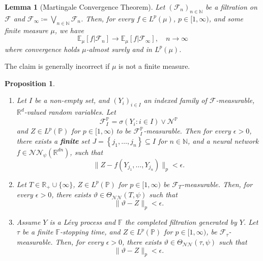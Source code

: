 \documentclass[11pt,a4paper,twoside,openany]{report}
\numberwithin{equation}{section}
\theoremstyle{plain} %
\newtheorem{proposition}[theorem]{Proposition}
\newtheorem{lemma}[theorem]{Lemma}
\theoremstyle{definition} %
\theoremstyle{remark} %
\begin{document}
\begin{lemma}[Martingale Convergence Theorem]\label{lemma:Martingale Convergence Theorem}
    Let \((\mathcal{F}_n)_{n\in\mathbb{N}}\) be a filtration on \(\mathcal{F}\) and \(\mathcal{F}_{\infty}\coloneqq\bigvee_{n\in\mathbb{N}}\mathcal{F}_n\). Then, for every \(f\in L^p(\mu)\), \(p\in[1,\infty)\), and some finite measure \(\mu\), we have
    \begin{equation*}
        \mathbb{E}_{\mu}[f|\mathcal{F}_n]\to\mathbb{E}_{\mu}[f|\mathcal{F}_{\infty}],\quad n\to\infty
    \end{equation*}
 where convergence holds \(\mu\)-almost surely and in \(L^p(\mu)\).
\end{lemma}
The claim is generally incorrect if \(\mu\) is not a finite measure.
\begin{proposition}\label{prop:approximation of measurable maps by algorithmic strategies}
\begin{enumerate}
    \item Let \(I\) be a non-empty set, and \((Y_i)_{i\in I}\) an indexed family of \(\mathcal{F}\)-measurable, \(\mathbb{R}^d\)-valued random variables. Let 
    \begin{equation*}
        \mathcal{F}_I^{\mathbb{P}}=\sigma(Y_i:i\in I)\vee\mathcal{N}^\mathbb{P}
    \end{equation*}
    and \(Z\in L^p(\mathbb{P})\) for \(p\in[1,\infty)\) to be \(\mathcal{F}_I^{\mathbb{P}}\)-measurable. Then for every \(\epsilon>0\), there exists a \textbf{finite} set \(J=\left\{j_1,\dots,j_n\right\}\subseteq I\) for \(n\in\mathbb{N}\), and a neural network \(f\in\mathcal{NN}_\psi(\mathbb{R}^{dn})\), such that 
    \begin{equation*}
        \lVert Z-f(Y_{j_1},\dots, Y_{j_n})\rVert_{p}<\epsilon.
    \end{equation*}
    \item Let  \(T\in\mathbb{R}_+\cup\{\infty\}\),  \(Z\in L^p(\mathbb{P})\) for \(p\in[1,\infty)\) be \(\mathcal{F}_T\)-measurable. Then, for every \(\epsilon>0\), there exists \(\vartheta\in\Theta_{\mathcal{NN}}(T,\psi)\) such that 
    \begin{equation*}
        \lVert \vartheta-Z\rVert_{p}<\epsilon.
    \end{equation*}
    \item Assume \(Y\) is a Lévy process and \(\mathbb{F}\) the completed filtration generated by \(Y\). Let \(\tau\) be a finite \(\mathbb{F}\)-stopping time, and \(Z\in L^p(\mathbb{P})\) for \(p\in[1,\infty)\), be \(\mathcal{F}_{\tau}\)-measurable. Then, for every \(\epsilon>0\), there exists \(\vartheta\in\Theta_{\mathcal{NN}}(\tau,\psi)\) such that 
    \begin{equation*}
        \lVert \vartheta-Z\rVert_{p}<\epsilon.
    \end{equation*}
\end{enumerate}
\end{proposition}
\end{document}
